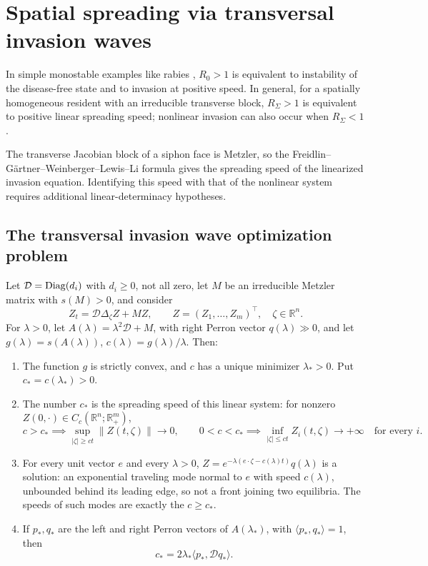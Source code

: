 \section{Spatial spreading via transversal invasion waves}
\label{s:nonscalar-waves}

In simple monostable examples like rabies \cite{ruan2017spatiotemporal}, $R_0>1$ is equivalent to instability of the disease-free state and to invasion at positive speed. In general, for a spatially homogeneous resident with an irreducible transverse block, $R_\Sigma>1$ is equivalent to positive linear spreading speed; nonlinear invasion can also occur when $R_\Sigma<1$.

The transverse Jacobian block of a siphon face is Metzler, so the Freidlin--G\"artner--Weinberger--Lewis--Li formula gives the spreading speed of the linearized invasion equation. Identifying this speed with that of the nonlinear system requires additional linear-determinacy hypotheses.

\subsection{The transversal invasion wave optimization problem}
\label{s:opt}


\label{t:spread}\label{p:LinSpread}
Let $\mathcal D=\operatorname{Diag}(d_i)$ with $d_i\ge0$, not all zero, let $M$ be an irreducible Metzler matrix with $s(M)>0$, and consider
\[
 Z_t=\mathcal D\Delta_\zeta Z+MZ,\qquad Z=(Z_1,\ldots,Z_m)^\top,\quad\zeta\in\mathbb R^n.
\]
For $\lambda>0$, let $A(\lambda)=\lambda^2\mathcal D+M$, with right Perron vector $q(\lambda)\gg0$, and let $g(\lambda)=s(A(\lambda))$, $c(\lambda)=g(\lambda)/\lambda$. Then:
\begin{enumerate}
\item The function $g$ is strictly convex, and $c$ has a unique minimizer $\lambda_*>0$. Put $c_*=c(\lambda_*)>0$.
\item The number $c_*$ is the spreading speed of this linear system: for nonzero $Z(0,\cdot)\in C_c(\mathbb R^n;\mathbb R_+^m)$,
\[
 c>c_*\implies\sup_{|\zeta|\ge ct}\|Z(t,\zeta)\|\to0,\qquad
 0<c<c_*\implies\inf_{|\zeta|\le ct}Z_i(t,\zeta)\to+\infty\quad\text{for every }i .
\]
\item For every unit vector $e$ and every $\lambda>0$, $Z=e^{-\lambda(e\cdot\zeta-c(\lambda)t)}q(\lambda)$ is a solution: an exponential traveling mode normal to $e$ with speed $c(\lambda)$, unbounded behind its leading edge, so not a front joining two equilibria. The speeds of such modes are exactly the $c\ge c_*$.
\item If $p_*,q_*$ are the left and right Perron vectors of $A(\lambda_*)$, with $\langle p_*,q_*\rangle=1$, then
\[
 c_*=2\lambda_*\langle p_*,\mathcal Dq_*\rangle.
\]
\end{enumerate}
\eeP

